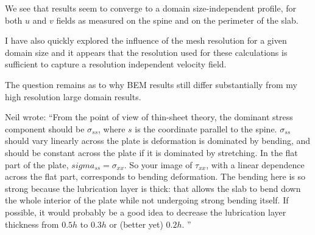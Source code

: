 We see that results seem to converge to a domain size-independent profile, for both $u$ and $v$
fields as measured on the spine and on the perimeter of the slab. 

I have also quickly explored the influence of the mesh resolution for a given domain size 
and it appears that the resolution used for these calculations is sufficient to capture 
a resolution independent velocity field.

The question remains as to why BEM results still differ substantially from my high resolution
large domain results.

Neil wrote: ``From the point of view of thin-sheet theory, the dominant stress component
should be $\sigma_{ss}$, where $s$ is the coordinate parallel to the spine. $\sigma_{ss}$
should vary linearly across the plate is deformation is dominated by bending,
and should be constant across the plate if it is dominated by stretching. In the 
flat part of the plate, $sigma_{ss} = \sigma_{xx}$. So your image of $\tau_{xx}$, with
a linear dependence across the flat part, corresponds to bending
deformation. The bending here is so strong because the 
lubrication layer is thick: that allows the slab to bend down the whole interior
of the plate while not undergoing strong bending itself. If possible, it would
probably be a good idea to decrease the lubrication layer thickness from
$0.5 h$ to $0.3 h$ or (better yet) $0.2 h$. ''









\newpage
